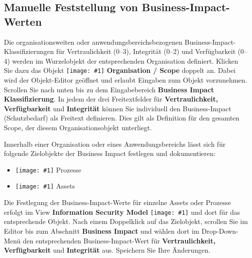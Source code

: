 \documentclass[a4paper,10pt]{book}
\newcommand{\icon}[1]{\texttt{[image: \#1]}}
\begin{document}
\subsection{Manuelle Feststellung von Business-Impact-Werten}

Die organisationsweiten oder anwendungsbereichsbezogenen
Business-Impact-Klassifizierungen für Vertraulichkeit (0--3), Integrität (0--2)
und Verfügbarkeit (0--4) werden im Wurzelobjekt der entsprechenden Organisation
definiert. Klicken Sie dazu das Objekt
\icon{Icon/GS_Modell.png} \textbf{Organisation / Scope}
doppelt an. Dabei wird der Objekt-Editor geöffnet und erlaubt Eingaben zum
Objekt vorzunehmen. Scrollen Sie nach unten bis zu dem Eingabebereich
\textbf{Business Impact Klassifizierung}. In jedem der drei Freitextfelder für
\textbf{Vertraulichkeit, Verfügbarkeit} und \textbf{Integrität} können Sie
individuell den Business-Impact (Schutzbedarf) als Freitext definieren. Dies
gilt als Definition für den gesamten Scope, der diesem Organisationsobjekt
unterliegt.

Innerhalb einer Organisation oder eines Anwendungsbereichs lässt sich
für folgende Zielobjekte der Business Impact festlegen und
dokumentieren:

\begin{itemize}
\item \icon{Icon/Prozesse.png} Prozesse
\item \icon{Icon/Asset.png} Assets
\end{itemize}

Die Festlegung der Business-Impact-Werte für einzelne Assets oder
Prozesse erfolgt im View \textbf{Information Security Model}
\icon{Icon/Informationssicherheitsmodell.png} und dort
für das entsprechende Objekt. Nach einem Doppelklick auf das Zielobjekt,
scrollen Sie im Editor bis zum Abschnitt \textbf{Business Impact} und wählen
dort im Drop-Down-Menü den entsprechenden Business-Impact-Wert für
\textbf{Vertraulichkeit, Verfügbarkeit} und \textbf{Integrität} aus. Speichern
Sie Ihre Änderungen.
\end{document}
